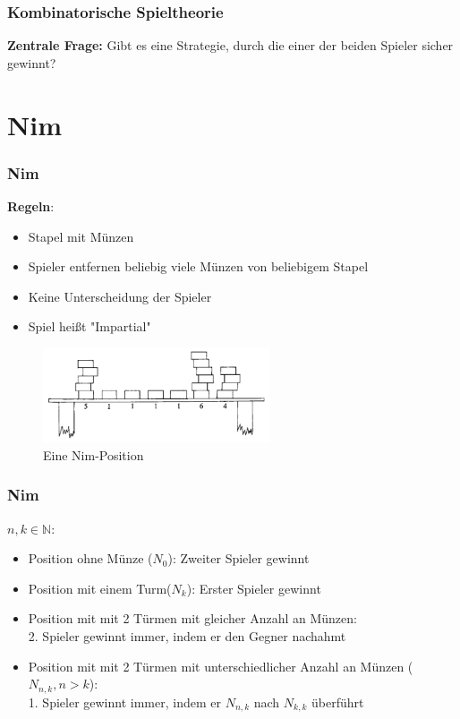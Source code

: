 \documentclass[12pt, aspectratio=169]{beamer}
\begin{document}
\begin{frame}
    \frametitle{Kombinatorische Spieltheorie}
    \centering
    \huge{\textbf{Zentrale Frage:} Gibt es eine Strategie, durch die einer der beiden Spieler sicher gewinnt?}
\end{frame}

\section{Nim}

\begin{frame}
    \frametitle{Nim}
    \textbf{Regeln}:
    \begin{itemize}
        \item<1-> Stapel mit Münzen
        \item<1-> Spieler entfernen beliebig viele Münzen von beliebigem Stapel
        \item<1-> Keine Unterscheidung der Spieler
        \item<2-> Spiel heißt "Impartial" 
    \end{itemize}
    \begin{figure}
        \centering
        \includegraphics[width=0.6\textwidth]{pic/nim-pos.png}
        \caption{Eine Nim-Position \tiny{\cite{ww}}}
    \end{figure}
\end{frame}

\begin{frame}
    \frametitle{Nim}
    $n,k \in \mathbb{N}$:
    \begin{itemize}
        \item<1-> Position ohne Münze ($N_{0}$): Zweiter Spieler gewinnt
        \item<2-> Position mit einem Turm($N_{k}$): Erster Spieler gewinnt
        \item<4-> Position mit mit 2 Türmen mit gleicher Anzahl an Münzen: \\ 2. Spieler gewinnt immer, indem er den Gegner nachahmt
        \item<5-> Position mit mit 2 Türmen mit unterschiedlicher Anzahl an Münzen ($N_{n,k}, n > k$): \\ 1. Spieler gewinnt immer, indem er $N_{n,k}$ nach $N_{k,k}$ überführt
    \end{itemize}
\end{frame}
\end{document}
